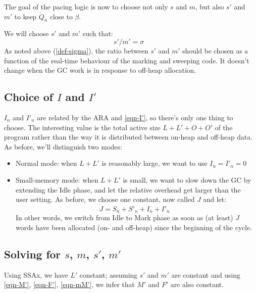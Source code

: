 \documentclass{article}
\begin{document}
The goal of the pacing logic is now to choose not only $s$ and $m$,
but also $s'$ and $m'$ to keep $\dot{Q}_n$ close to $\beta$.

We will choose $s'$ and $m'$ such that:
\begin{equation}\label{sigma-prime}
s' / m' = \sigma
\end{equation}
As noted above (\eqref{def-sigma}), the ratio between $s'$ and $m'$
should be chosen as a function of the real-time behaviour of the
marking and sweeping code. It doesn't change when the GC work is in
response to off-heap allocation.

\subsection[Choice of I and I']{Choice of $I$ and $I'$}

$I_n$ and $I'_n$ are related by the ARA and \eqref{eqn-I'}, so there's
only one
thing to choose. The interesting value is the total active size
$L + L' + O + O'$ of the program rather than the way it is distributed between
on-heap and off-heap data. As before, we'll distinguish two modes:
\begin{itemize}
\item Normal mode: when $L+L'$ is reasonably large, we want to use
$I_n = I'_n = 0$
\item Small-memory mode: when $L+L'$ is small, we want to slow down
the GC by extending the Idle phase, and let the relative overhead get
larger than the user setting. As before, we choose one constant, now
called $\dot{J}$ and let:
\begin{equation}\label{eqn-Jdot}
\dot{J} = S_n + S'_n + I_n + I'_n
\end{equation}
In other words, we switch from Idle to Mark phase as soon as
(at least) $\dot{J}$ words have been allocated (on- and off-heap) since the
beginning of the cycle.
\end{itemize}

\subsection[Solving for s, m, s', m']{Solving for $s$, $m$, $s'$, $m'$}

Using SSAx, we have $L'$ constant; assuming $s'$ and $m'$ are constant
and using
\eqref{eqn-M'}, \eqref{eqn-F'}, \eqref{eqn-mM'}, we infer that
$M'$ and $F'$ are also constant.
\end{document}

